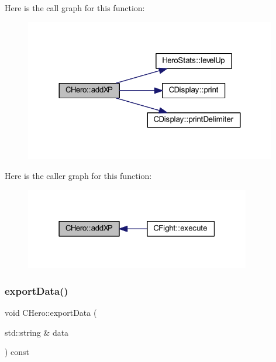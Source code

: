 Here is the call graph for this function\+:\nopagebreak
\begin{figure}[H]
\begin{center}
\leavevmode
\includegraphics[width=312pt]{class_c_hero_aa184a6841da51966480c2172c2f80134_cgraph}
\end{center}
\end{figure}
Here is the caller graph for this function\+:\nopagebreak
\begin{figure}[H]
\begin{center}
\leavevmode
\includegraphics[width=279pt]{class_c_hero_aa184a6841da51966480c2172c2f80134_icgraph}
\end{center}
\end{figure}
\mbox{\label{class_c_hero_a1593ac4dfc01368e99b2b82a21c3c6ed}} 
\subsubsection{\texorpdfstring{export\+Data()}{exportData()}}
{\footnotesize\ttfamily void C\+Hero\+::export\+Data (\begin{DoxyParamCaption}\item[{std\+::string \&}]{data }\end{DoxyParamCaption}) const}

